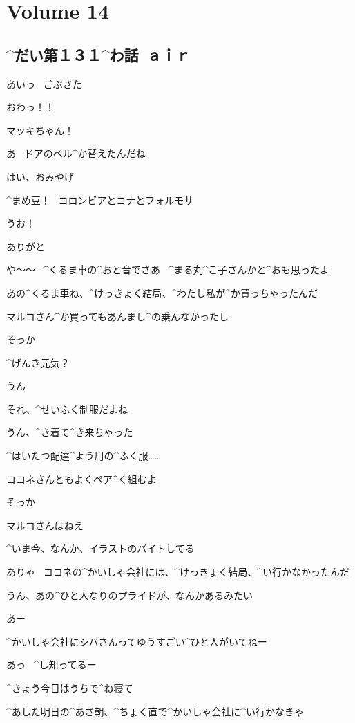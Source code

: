 \section{Volume 14}

\subsection{^{だい}{第}１３１^{わ}{話}\ ａｉｒ}

\page[6]
\M あいっ
\ ごぶさた

\A おわっ！！

\A マッキちゃん！

\M あ
\ ドアのベル^{か}{替}えたんだね

\page
\M はい、おみやげ

\M ^{まめ}{豆}！
\ コロンビアとコナとフォルモサ

\A うお！

\A ありがと

\A や〜〜
\ ^{くるま}{車}の^{おと}{音}でさあ
\ ^{まる}{丸}^{こ}{子}さんかと^{おも}{思}ったよ

\M あの^{くるま}{車}ね、^{けっきょく}{結局}、^{わたし}{私}が^{か}{買}っちゃったんだ

\M マルコさん^{か}{買}ってもあんまし^{の}{乗}んなかったし

\A そっか

\A ^{げんき}{元気}？

\M うん

\page
\A それ、^{せいふく}{制服}だよね

\M うん、^{き}{着}て^{き}{来}ちゃった

\M ^{はいたつ}{配達}^{よう}{用}の^{ふく}{服}……

\M ココネさんともよくペア^{く}{組}むよ

\A そっか

\page
\M マルコさんはねえ

\M ^{いま}{今}、なんか、イラストのバイトしてる

\A ありゃ
\ ココネの^{かいしゃ}{会社}には、^{けっきょく}{結局}、^{い}{行}かなかったんだ

\M うん、あの^{ひと}{人}なりのプライドが、なんかあるみたい

\A あー

\M ^{かいしゃ}{会社}にシバさんってゆうすごい^{ひと}{人}がいてねー

\A あっ
\ ^{し}{知}ってるー

\page[12]
\M ^{きょう}{今日}はうちで^{ね}{寝}て

\M ^{あした}{明日}の^{あさ}{朝}、^{ちょく}{直}で^{かいしゃ}{会社}に^{い}{行}かなきゃ

